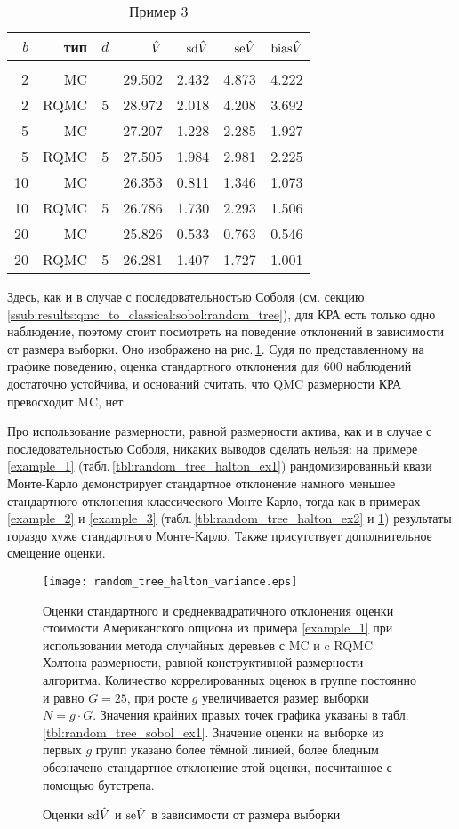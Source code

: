 \begin{table}
    \centering
    \caption{Пример 3}\label{tbl:random_tree_halton_ex3}
    \begin{tabular}{rrrrrrr}
        $b$&тип&$d$&$\hat{V}$&$\mathrm{sd}\hat{V}$&$\mathrm{se}\hat{V}$&$\mathrm{bias}\hat{V}$\\[3pt]\hline\\[-8pt]
        2&MC&&29.502&2.432&4.873&4.222\\
        2&RQMC&5&28.972&2.018&4.208&3.692\\[3pt]
        5&MC&&27.207&1.228&2.285&1.927\\
        5&RQMC&5&27.505&1.984&2.981&2.225\\[3pt]
        10&MC&&26.353&0.811&1.346&1.073\\
        10&RQMC&5&26.786&1.730&2.293&1.506\\[3pt]
        20&MC&&25.826&0.533&0.763&0.546\\
        20&RQMC&5&26.281&1.407&1.727&1.001\\[3pt]
    \end{tabular}
\end{table}

Здесь, как и в случае с последовательностью Соболя (см. секцию\,\ref{ssub:results:qmc_to_classical:sobol:random_tree}), для КРА есть только одно наблюдение, поэтому стоит посмотреть на поведение отклонений в зависимости от размера выборки. Оно изображено на рис.\,\ref{fig:random_tree_halton_variance}. Судя по представленному на графике поведению, оценка стандартного отклонения для 600 наблюдений достаточно устойчива, и оснований считать, что QMC размерности КРА превосходит MC, нет.

Про использование размерности, равной размерности актива, как и в случае с последовательностью Соболя, никаких выводов сделать нельзя: на примере \ref{example_1} (табл.\,\ref{tbl:random_tree_halton_ex1}) рандомизированный квази Монте-Карло демонстрирует стандартное отклонение намного меньшее стандартного отклонения классического Монте-Карло, тогда как в примерах \ref{example_2} и \ref{example_3} (табл.\,\ref{tbl:random_tree_halton_ex2} и \ref{tbl:random_tree_halton_ex3}) результаты гораздо хуже стандартного Монте-Карло. Также присутствует дополнительное смещение оценки.

\begin{figure}[h]
    \centering
    \texttt{[image: random\_tree\_halton\_variance.eps]}
    \caption{Оценки $\mathrm{sd}\hat{V}$ и $\mathrm{se}\hat{V}$ в зависимости от размера выборки}
    \label{fig:random_tree_halton_variance}
    \footnotesize
    Оценки стандартного и среднеквадратичного отклонения оценки стоимости Американского опциона из примера \ref{example_1} при использовании метода случайных деревьев с MC и c RQMC Холтона размерности, равной конструктивной размерности алгоритма. Количество коррелированных оценок в группе постоянно и равно $G=25$, при росте $g$ увеличивается размер выборки $N=g\cdot G$. Значения крайних правых точек графика указаны в табл.\,\ref{tbl:random_tree_sobol_ex1}. Значение оценки на выборке из первых $g$ групп указано более тёмной линией, более бледным обозначено стандартное отклонение этой оценки, посчитанное с помощью бутстрепа.
\end{figure}

